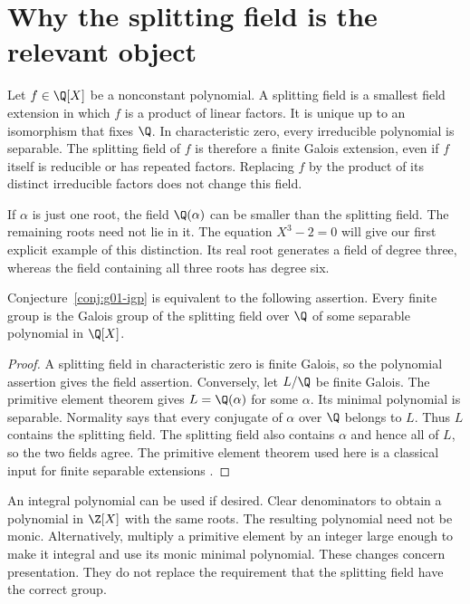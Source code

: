 \section{Why the splitting field is the relevant object}

Let $f\in\Q[X]$ be a nonconstant polynomial. A splitting field is a smallest field extension in which $f$ is a product of linear factors. It is unique up to an isomorphism that fixes $\Q$. In characteristic zero, every irreducible polynomial is separable. The splitting field of $f$ is therefore a finite Galois extension, even if $f$ itself is reducible or has repeated factors. Replacing $f$ by the product of its distinct irreducible factors does not change this field.

If $\alpha$ is just one root, the field $\Q(\alpha)$ can be smaller than the splitting field. The remaining roots need not lie in it. The equation $X^3-2=0$ will give our first explicit example of this distinction. Its real root generates a field of degree three, whereas the field containing all three roots has degree six.

\begin{proposition}
\label{prop:g01-polynomial}
Conjecture~\ref{conj:g01-igp} is equivalent to the following assertion. Every finite group is the Galois group of the splitting field over $\Q$ of some separable polynomial in $\Q[X]$.
\end{proposition}

\begin{proof}
A splitting field in characteristic zero is finite Galois, so the polynomial assertion gives the field assertion. Conversely, let $L/\Q$ be finite Galois. The primitive element theorem gives $L=\Q(\alpha)$ for some $\alpha$. Its minimal polynomial is separable. Normality says that every conjugate of $\alpha$ over $\Q$ belongs to $L$. Thus $L$ contains the splitting field. The splitting field also contains $\alpha$ and hence all of $L$, so the two fields agree. The primitive element theorem used here is a classical input for finite separable extensions \cite{Milne2022}.
\end{proof}

An integral polynomial can be used if desired. Clear denominators to obtain a polynomial in $\Z[X]$ with the same roots. The resulting polynomial need not be monic. Alternatively, multiply a primitive element by an integer large enough to make it integral and use its monic minimal polynomial. These changes concern presentation. They do not replace the requirement that the splitting field have the correct group.

